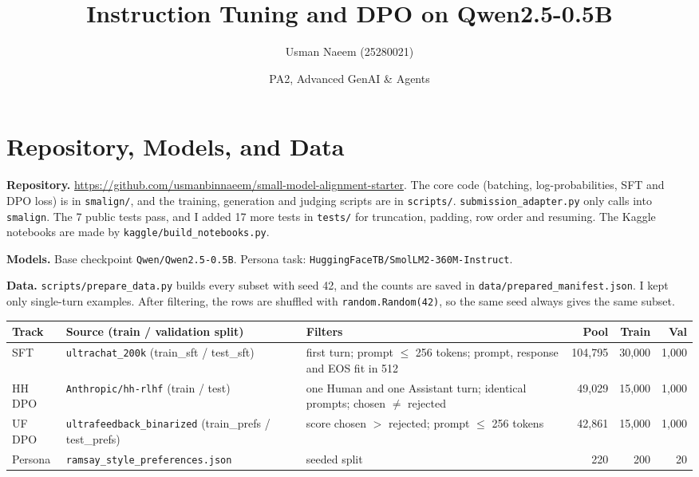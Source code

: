 \documentclass[10pt,a4paper]{article}
\title{Instruction Tuning and DPO on Qwen2.5-0.5B}
\author{Usman Naeem (25280021)}
\date{PA2, Advanced GenAI \& Agents}
\begin{document}
\maketitle
\vspace{-1.5em}

\section{Repository, Models, and Data}

\textbf{Repository.} \url{https://github.com/usmanbinnaeem/small-model-alignment-starter}. The core code
(batching, log-probabilities, SFT and DPO loss) is in \texttt{smalign/}, and the training, generation and judging scripts
are in \texttt{scripts/}. \texttt{submission\_adapter.py} only calls into \texttt{smalign}. The 7 public tests pass, and
I added 17 more tests in \texttt{tests/} for truncation, padding, row order and resuming. The Kaggle notebooks are made
by \texttt{kaggle/build\_notebooks.py}.

\textbf{Models.} Base checkpoint \texttt{Qwen/Qwen2.5-0.5B}. Persona task: \texttt{HuggingFaceTB/SmolLM2-360M-Instruct}.

\textbf{Data.} \texttt{scripts/prepare\_data.py} builds every subset with seed 42, and the counts are saved in
\texttt{data/prepared\_manifest.json}. I kept only single-turn examples. After filtering, the rows are shuffled with
\texttt{random.Random(42)}, so the same seed always gives the same subset.

\begin{center}\small
\setlength{\tabcolsep}{4pt}
\begin{tabularx}{\linewidth}{l>{\raggedright\arraybackslash}X>{\raggedright\arraybackslash}Xrrr}
\toprule
Track & Source (train / validation split) & Filters & Pool & Train & Val \\
\midrule
SFT & \texttt{ultrachat\_200k} (train\_sft / test\_sft) & first turn; prompt $\le$ 256 tokens; prompt, response and EOS fit in 512 & 104,795 & 30,000 & 1,000 \\
HH DPO & \texttt{Anthropic/hh-rlhf} (train / test) & one Human and one Assistant turn; identical prompts; chosen $\ne$ rejected & 49,029 & 15,000 & 1,000 \\
UF DPO & \texttt{ultrafeedback\_binarized} (train\_prefs / test\_prefs) & score chosen $>$ rejected; prompt $\le$ 256 tokens & 42,861 & 15,000 & 1,000 \\
Persona & \texttt{ramsay\_style\_preferences.json} & seeded split & 220 & 200 & 20 \\
\bottomrule
\end{tabularx}
\end{center}
\end{document}
